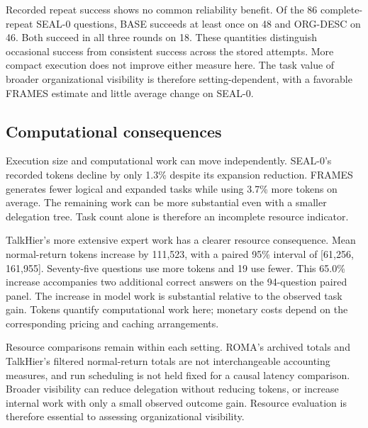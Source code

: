 \documentclass[10pt,letterpaper,twocolumn]{article}
\begin{document}
Recorded repeat success shows no common reliability benefit. Of the 86 complete-repeat SEAL-0 questions, BASE succeeds at least once on 48 and ORG-\allowbreak{}DESC on 46. Both succeed in all three rounds on 18. These quantities distinguish occasional success from consistent success across the stored attempts. More com\-pact ex\-e\-cu\-tion does not improve either measure here. The task value of broad\-er or\-ga\-ni\-za\-tion\-al vis\-i\-bil\-i\-ty is therefore setting-dependent, with a favorable FRAMES estimate and little average change on SEAL-0.

\subsection{Computational con\-se\-quences}
Execution size and com\-pu\-ta\-tion\-al work can move independently. SEAL-0's re\-cord\-ed tokens decline by only 1.3\% despite its ex\-pan\-sion re\-duc\-tion. FRAMES generates fewer logical and expanded tasks while using 3.7\% more tokens on average. The remaining work can be more substantial even with a smaller del\-e\-ga\-tion tree. Task count alone is therefore an incomplete resource indicator.

TalkHier's more extensive expert work has a clearer resource consequence. Mean normal-return tokens increase by 111,523, with a paired 95\% interval of [61,256, 161,955]. Seventy-five questions use more tokens and 19 use fewer. This 65.0\% increase accompanies two additional correct answers on the 94-ques\-tion paired panel. The increase in mod\-el work is substantial relative to the observed task gain. Tokens quantify com\-pu\-ta\-tion\-al work here; monetary costs depend on the corresponding pricing and caching arrangements.

Resource comparisons remain within each setting. ROMA's ar\-chived totals and TalkHier's filtered normal-return totals are not interchangeable accounting mea\-sures, and run scheduling is not held fixed for a causal latency comparison. Broader vis\-i\-bil\-i\-ty can reduce del\-e\-ga\-tion without reducing tokens, or increase in\-ter\-nal work with only a small observed out\-come gain. Resource evaluation is therefore essential to assessing or\-ga\-ni\-za\-tion\-al vis\-i\-bil\-i\-ty.
\end{document}

